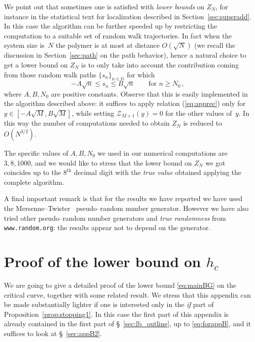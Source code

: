 \documentclass[reqno,11pt]{amsart}
\numberwithin{equation}{section}
\newcommand{\N}{\mathbb{N}}
\newcommand{\cZ}{{\ensuremath{\mathcal Z}} }
\begin{document}
\medskip

We point out that sometimes one is satisfied with \textsl{lower bounds} on $Z_N$, for instance in the statistical text for localization described in Section~\ref{sec:superadd}. In this case the algorithm can be further speeded up by restricting the computation to a suitable set of random walk trajectories. In fact when the system size is~$N$ the polymer is at most at distance $O(\sqrt{N})$ (we recall the discussion in Section~\ref{sec:path} on the path behavior), hence a natural choice to get a lower bound on $Z_N$ is to only take into account the contribution coming from those random walk paths $\{s_n\}_{n\in\N}$ for which
\begin{equation}
-A\sqrt{n} \le s_n \le B \sqrt{n} \qquad \text{for } n \ge N_0\,,
\end{equation}
where $A,B,N_0$ are positive constants. Observe that this is easily implemented in the algorithm described above: it suffices to apply relation (\ref{eq:apprec}) only for $y\in[-A\sqrt M, B\sqrt M]$, while setting $\cZ_{M+1}(y)=0$ for the other values of~$y$. In this way the number of computations needed to obtain $Z_N$ is reduced to~$O(N^{3/2})$.

The specific values of $A,B,N_0$ we used in our numerical computations are $3,8,1000$, and we would like to stress that the lower bound on $Z_N$ we got coincides up to the $8^{\text{th}}$ decimal digit with the {\sl true value} obtained applying the complete algorithm.



\smallskip
A final important remark is that for the results we have reported we have used
the Mersenne--Twister~\cite{cf:MT} pseudo--random number generator.
However we have also tried other pseudo--random number generators
and {\sl true randomness} from {\tt www.random.org}:
the results appear not to depend on the generator.



\section{Proof of the lower bound on $h_c$}
\label{app:prooflb}
We are going to give a detailed proof of the lower bound \eqref{eq:mainBG} on the critical curve, together with some related result. We stress that this appendix can be made substantially lighter
if one is interested only in the {\sl if} part of Proposition~\ref{prop:stopping1}. In this case
the first part of this appendix is already contained in the first part of \S~\ref{sec:lb_outline}, up
to \eqref{eq:forappB}, and it suffices to look at \S~\ref{sec:appB2}.
\end{document}
